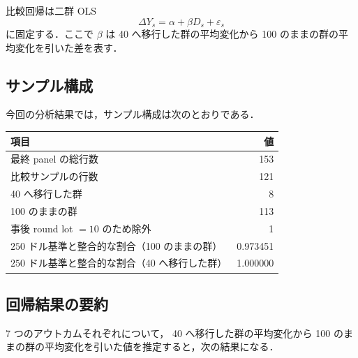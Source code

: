 \documentclass[a4paper,11pt]{jlreq}
\begin{document}
比較回帰は二群 OLS
\[
  \Delta Y_s = \alpha + \beta D_s + \varepsilon_s
\]
に固定する．ここで \(\beta\) は
40 へ移行した群の平均変化から
100 のままの群の平均変化を引いた差を表す．

\subsection{サンプル構成}

今回の分析結果では，サンプル構成は次のとおりである．

\begin{center}
\begin{tabular}{lr}
\toprule
項目 & 値 \\
\midrule
最終 panel の総行数 & 153 \\
比較サンプルの行数 & 121 \\
40 へ移行した群 & 8 \\
100 のままの群 & 113 \\
事後 round lot \(=10\) のため除外 & 1 \\
\(250\) ドル基準と整合的な割合（100 のままの群） & 0.973451 \\
\(250\) ドル基準と整合的な割合（40 へ移行した群） & 1.000000 \\
\bottomrule
\end{tabular}
\end{center}

\subsection{回帰結果の要約}

7 つのアウトカムそれぞれについて，
40 へ移行した群の平均変化から
100 のままの群の平均変化を引いた値を推定すると，次の結果になる．
\end{document}
